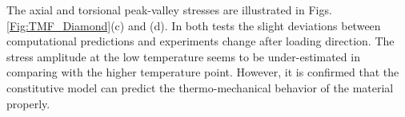 The axial and torsional peak-valley stresses are illustrated in  Figs. \ref{Fig:TMF_Diamond}(c) and (d).
In both tests the slight deviations between computational predictions and experiments  change after  loading direction. The stress amplitude at the low temperature seems to be under-estimated in comparing with the higher temperature point. However, it is confirmed that the constitutive model can predict the thermo-mechanical behavior of the material properly.



